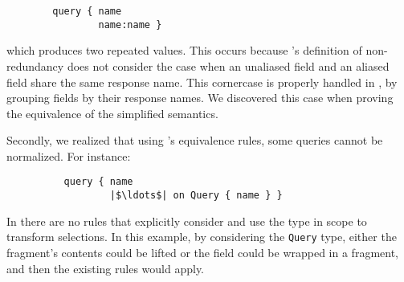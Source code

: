\begin{verbatim}
        query { name
                name:name }
\end{verbatim}
which produces two repeated values. This occurs because \HP's definition of non-redundancy does not consider the case when an unaliased field and an aliased field share the same response name. This cornercase is properly handled in \gcoql, by grouping fields by their response names. We discovered this case when proving the equivalence of the simplified semantics.

Secondly, we realized that using \HP's equivalence rules, some queries cannot be normalized.
For instance:
\begin{verbatim}
          query { name
                  |$\ldots$| on Query { name } }
\end{verbatim}
In \HP there are no rules that explicitly consider and use the type in scope to transform selections. In this example, by considering the \texttt{Query} type, either the fragment's contents could be lifted or the field could be wrapped in a fragment, and then the existing rules would apply. 


